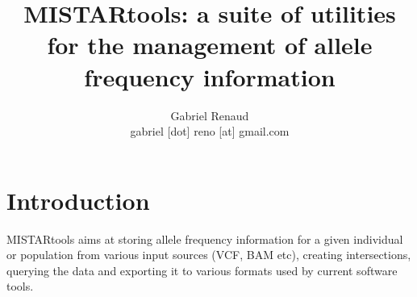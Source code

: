 \documentclass[a4paper]{article}
\title{MISTARtools: a suite of utilities for the management of allele frequency information}
\author{Gabriel Renaud \\
gabriel [dot] reno [at]  gmail.com}
\date{}
\begin{document}
\maketitle

\begin{abstract}


\end{abstract}

\tableofcontents

\section{Introduction}

MISTARtools aims at storing allele frequency information for a given individual or population from various input sources (VCF, BAM etc), creating intersections, querying the data and exporting it to various formats used by current software tools.
\end{document}
